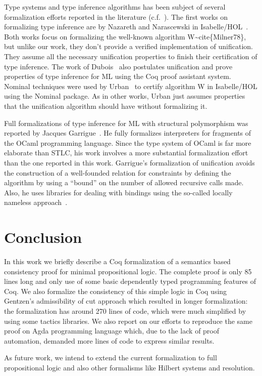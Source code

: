 Type systems and type inference algorithms has been subject of several formalization efforts
reported in the literature (c.f.~\cite{DuboisM99,NaraschewskiN-JAR,Nazareth-Nipkow,UrbanN2009,Garrigue10,Garrigue15}).
The first works on formalizing type inference are by Nazareth and
Narascewski in Isabelle/HOL~\cite{NaraschewskiN-JAR,Nazareth-Nipkow}.
Both works focus on formalizing the well-known algorithm
W\~{}cite\{Milner78\}, but unlike our work, they don't provide a verified
implementation of unification. They assume all the necessary
unification properties to finish their certification of type
inference. The work of Dubois~\cite{DuboisM99} also postulates
unification and prove properties of type inference for ML using the
Coq proof assistant system.  Nominal techniques were used by
Urban~\cite{UrbanN2009} to certify algorithm W in Isabelle/HOL using
the Nominal package. As in other works, Urban just assumes properties
that the unification algorithm should have without formalizing it.


Full formalizations of type inference for ML with structural
polymorphism was reported by Jacques
Garrigue~\cite{Garrigue10,Garrigue15}. He fully formalizes
interpreters for fragments of the OCaml programming language. Since
the type system of OCaml is far more elaborate than STLC, his work
involves a more substantial formalization effort than the one reported
in this work. Garrigue's formalization of unification avoids the
construction of a well-founded relation for constraints by defining
the algorithm by using a ``bound'' on the number of allowed recursive
calls made.  Also, he uses libraries for dealing with bindings using
the so-called locally nameless approach~\cite{Chargueraud12}.


\section{Conclusion}\label{sec:conclusion}


In this work we briefly describe a Coq formalization of a semantics based consistency proof for
minimal propositional logic. The complete proof is only 85 lines long and only use of some basic
dependently typed programming features of Coq. We also
formalize the consistency of this simple logic in Coq using Gentzen's admissibility of cut approach
which resulted in longer formalization: the formalization has around 270 lines of code, which were much
simplified by using some tactics libraries. We also report on our efforts to reproduce the same proof
on Agda programming language which, due to the lack of proof automation, demanded more lines of code
to express similar results.


As future work, we intend to extend the current formalization to full propositional logic and also
other formalisms like Hilbert systems and resolution.
 \begin{coqdoccode}
\end{coqdoccode}
